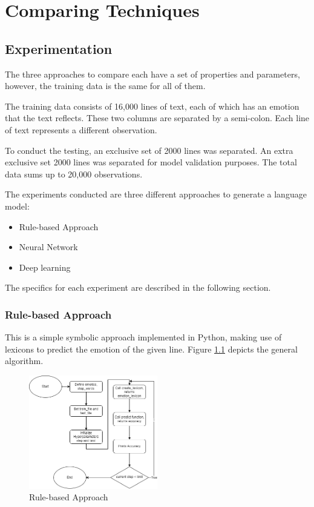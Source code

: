 \chapter{Comparing Techniques}
\label{chapter:chapter02}

\section{Experimentation}

The three approaches to compare each have a set of properties and parameters, however, the training data is the same for all of them.

The training data consists of 16,000 lines of text, each of which has an emotion that the text reflects. These two columns are separated by a semi-colon. Each line of text represents a different observation. 

To conduct the testing, an exclusive set of 2000 lines was separated. An extra exclusive set 2000 lines was separated for model validation purposes. The total data sums up to 20,000 observations.

The experiments conducted are three different approaches to generate a language model:

\begin{itemize}
    \item Rule-based Approach
    \item Neural Network
    \item Deep learning
\end{itemize}

The specifics for each experiment are described in the following section.

\subsection{Rule-based Approach}

This is a simple symbolic approach implemented in Python, making use of lexicons to predict the emotion of the given line. Figure \ref{fig:rule-1} depicts the general algorithm.

\begin{figure}[H]
    \centering
    \includegraphics*[width=0.5\textwidth]{images/rules.png}
    \caption{Rule-based Approach}
    \label{fig:rule-1}
\end{figure}

